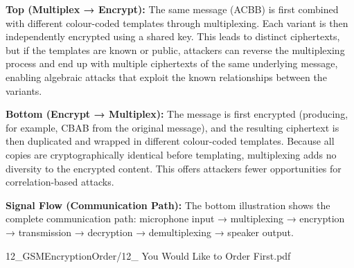 \begin{SideNotePage}{
  \textbf{Top (Multiplex → Encrypt):} The same message (ACBB) is first combined with different colour-coded templates through multiplexing. Each variant is then independently encrypted using a shared key. This leads to distinct ciphertexts, but if the templates are known or public, attackers can reverse the multiplexing process and end up with multiple ciphertexts of the same underlying message, enabling algebraic attacks that exploit the known relationships between the variants. \par

  \textbf{Bottom (Encrypt → Multiplex):} The message is first encrypted (producing, for example, CBAB from the original message), and the resulting ciphertext is then duplicated and wrapped in different colour-coded templates. Because all copies are cryptographically identical before templating, multiplexing adds no diversity to the encrypted content. This offers attackers fewer opportunities for correlation-based attacks. \par

  \textbf{Signal Flow (Communication Path):} The bottom illustration shows the complete communication path: microphone input → multiplexing → encryption → transmission → decryption → demultiplexing → speaker output. \par
}{12_GSMEncryptionOrder/12_ You Would Like to Order First.pdf}
\end{SideNotePage}
